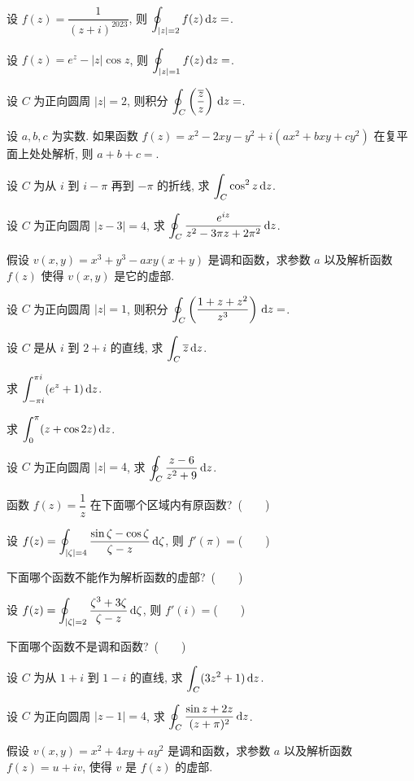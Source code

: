 \item 设 $f(z)=\dfrac1{(z+i)^{2023}}$, 则 $\displaystyle\oint_{|z|=2}f(z)\,\mathrm{d} z=$\fillblank{}.

\item 设 $f(z)=e^z-|z|\cos z$, 则 $\displaystyle\oint_{|z|=1}f(z)\,\mathrm{d} z=$\fillblank{}.
\item 设 $C$ 为正向圆周 $|z|=2$, 则积分 $\displaystyle\oint_C\left(\frac{\overline z}{z}\right)\,\mathrm{d} z=$\fillblank{}.
\item 设 $a,b,c$ 为实数. 如果函数 $f(z)=x^2-2xy-y^2+i(ax^2+bxy+cy^2)$ 在复平面上处处解析, 则 $a+b+c=$\fillblank{}.
\item 设 $C$ 为从 $i$ 到 $i-\pi$ 再到 $-\pi$ 的折线, 求 $\displaystyle\int_C\cos^2z\,\mathrm{d} z$.
\item 设 $C$ 为正向圆周 $|z-3|=4$, 求 $\displaystyle\oint_C\frac{e^{iz}}{z^2-3\pi z+2\pi^2}\,\mathrm{d} z$.
\item 假设 $v(x,y)=x^3+y^3-axy(x+y)$ 是调和函数，求参数 $a$ 以及解析函数 $f(z)$ 使得 $v(x,y)$ 是它的虚部.
\item 设 $C$ 为正向圆周 $|z|=1$, 则积分 $\displaystyle\oint_C\left(\frac{1+z+z^2}{z^3}\right)\,\mathrm{d} z=$\fillblank{}.\item 设 $C$ 是从 $i$ 到 $2+i$ 的直线, 求 $\displaystyle\int_C \overline z\,\mathrm{d} z$.
\item 求 $\displaystyle\int_{-\pi i}^{\pi i}(e^z+1)\,\mathrm{d} z$.
\item 求 $\displaystyle\int_0^\pi (z+\cos 2z)\,\mathrm{d} z$.
\item 设 $C$ 为正向圆周 $|z|=4$, 求 $\displaystyle\oint_C\frac{z-6}{z^2+9}\,\mathrm{d} z$.
\item 函数 $f(z)=\dfrac 1z$ 在下面哪个区域内有原函数?~(~~~~)
\item 设 $f(z)=\displaystyle\oint_{|\zeta|=4}\dfrac{\sin\zeta-\cos\zeta}{\zeta-z}\,\mathrm{d}\zeta$, 则 $f'(\pi)=$(~~~~)
\item 下面哪个函数不能作为解析函数的虚部?~(~~~~)
\item 设 $f(z)=\displaystyle\oint_{|\zeta|=2}\dfrac{\zeta^3+3\zeta}{\zeta-z}\,\mathrm{d}\zeta$, 则 $f'(i)=$(~~~~)
\item 下面哪个函数不是调和函数?~(~~~~)
\item 设 $C$ 为从 $1+i$ 到 $1-i$ 的直线, 求 $\displaystyle\int_C (3z^2+1) \,\mathrm{d} z$.
\item 设 $C$ 为正向圆周 $|z-1|=4$, 求 $\displaystyle\oint_C\frac{\sin z+2z}{(z+\pi)^2}\,\mathrm{d} z$.
\item 假设 $v(x,y)=x^2+4xy+ay^2$ 是调和函数，求参数 $a$ 以及解析函数 $f(z)=u+iv$, 使得 $v$ 是 $f(z)$ 的虚部.





